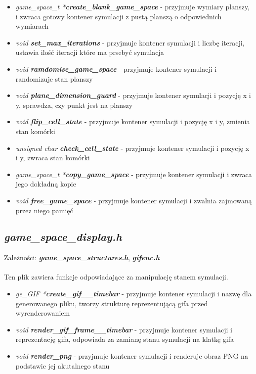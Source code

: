 \documentclass[12pt]{article}
\begin{document}
        \begin{itemize}
            \item \textit{game\_space\_t *\textbf{create\_blank\_game\_space}} - przyjmuje wymiary planszy, i zwraca gotowy kontener symulacji z pustą planszą o odpowiednich wymiarach
            \item \textit{void \textbf{set\_max\_iterations}} - przyjmuje kontener symulacji i liczbę iteracji, ustawia ilość iteracji które ma prsebyć symulacja
            \item \textit{void \textbf{ramdomise\_game\_space}} - przyjmuje kontener symulacji i randomizuje stan planszy
            \item \textit{void \textbf{plane\_dimension\_guard}} - przyjmuje kontener symulacji i pozycję x i y, sprawdza, czy punkt jest na planszy
            \item \textit{void \textbf{flip\_cell\_state}} - przyjmuje kontener symulacji i pozycję x i y, zmienia stan komórki
            \item \textit{unsigned char \textbf{check\_cell\_state}} - przyjmuje kontener symulacji i pozycję x i y, zwraca stan komórki
            \item \textit{game\_space\_t *\textbf{copy\_game\_space}} - przyjmuje kontener symulacji i zwraca jego dokładną kopie
            \item \textit{void \textbf{free\_game\_space}} - przyjmuje kontener symulacji i zwalnia zajmowaną przez niego pamięć
        \end{itemize}


    \subsection{\textbf{\textit{game\_space\_display.h}}}
        Zależności: \textit{ \textbf{game\_space\_structures.h}}, \textit{ \textbf{gifenc.h}}\\\\
        Ten plik zawiera funkcje odpowiadające za manipulację stanem symulacji.

        \begin{itemize}
            \item \textit{ge\_GIF *\textbf{create\_gif\_\_timebar}} - przyjmuje kontener symulacji i nazwę dla generowanego pliku, tworzy strukturę reprezentującą gifa przed wyrenderowaniem
            \item \textit{void \textbf{render\_gif\_frame\_\_timebar}} - przyjmuje kontener symulacji i reprezentację gifa, odpowiada za zamianę stanu symulacji na klatkę gifa
            \item \textit{void \textbf{render\_png}} - przyjmuje kontener symulacji i renderuje obraz PNG na podstawie jej akutalnego stanu
        \end{itemize}
\end{document}
